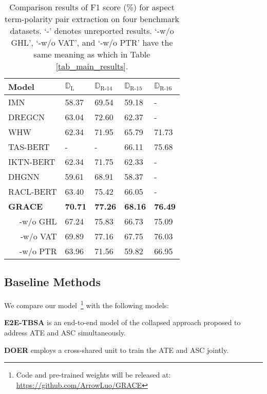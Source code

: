 \documentclass[11pt,a4paper]{article}
\begin{document}
\begin{table}[htp]
    \centering
    \begin{tabular}{|l|p{0.8cm}<{\centering}|p{0.8cm}<{\centering}|p{0.8cm}<{\centering}|p{0.8cm}<{\centering}|}
        \hline
        Model     & $\mathbb{D}_\text{L}$ & $\mathbb{D}_\text{R-14}$ & $\mathbb{D}_\text{R-15}$ & $\mathbb{D}_\text{R-16}$ \\ \hline \hline
        IMN & 58.37 & 69.54 & 59.18 & - \\
        DREGCN & 63.04 & 72.60 & 62.37 & - \\
        WHW & 62.34 & 71.95 & 65.79 & 71.73 \\
        TAS-BERT & - & - & 66.11 & 75.68 \\
        IKTN-BERT & 62.34 & 71.75 & 62.33 & - \\
        DHGNN & 59.61 & 68.91 & 58.37 & - \\ 
        RACL-BERT & 63.40  & 75.42 & 66.05 & - \\ \hline
        \textbf{GRACE} & \textbf{70.71} & \textbf{77.26} & \textbf{68.16} & \textbf{76.49} \\
        \multicolumn{1}{|r|}{-w/o GHL} & 67.24  & 75.83 & 66.73 & 75.09  \\
        \multicolumn{1}{|r|}{-w/o VAT} & 69.89 & 77.16 & 67.75 & 76.03   \\
        \multicolumn{1}{|r|}{-w/o PTR} & 63.96 & 71.56 & 59.82 & 66.95  \\
        \hline
    \end{tabular}
    \caption{Comparison results of F1 score (\%) for aspect term-polarity pair extraction on four benchmark datasets. `-' denotes unreported results. `-w/o GHL', `-w/o VAT', and `-w/o PTR' have the same meaning as which in Table \ref{tab_main_results}.}
    \label{tab_main_results_noimp}
\end{table}

\subsection{Baseline Methods}
We compare our model~\footnote{Code and pre-trained weights will be released at: \url{https://github.com/ArrowLuo/GRACE}} with the following models:

\noindent
\textbf{E2E-TBSA} \cite{Li2019a} is an end-to-end model of the collapsed approach proposed to address ATE and ASC simultaneously.

\noindent
\textbf{DOER} \cite{Luo2019} employs a cross-shared unit to train the ATE and ASC jointly.
\end{document}
